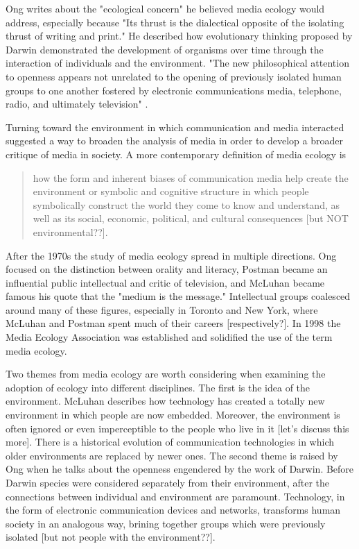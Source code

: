 Ong writes about the "ecological concern" he believed media ecology would address, especially because "Its thrust is the dialectical opposite of the isolating thrust of writing and print." He described how evolutionary thinking proposed by Darwin demonstrated the development of organisms over time through the interaction of individuals and the environment. "The new philosophical attention to openness appears not unrelated to the opening of previously isolated human groups to one another fostered by electronic communications media, telephone, radio,
and ultimately television" \citep[][p. 324]{ong_interfaces_1977}.

Turning toward the environment in which communication and media interacted suggested a way to broaden the analysis of media in order to develop a broader critique of media in society. A more contemporary definition of media ecology is

\begin{quote}
how the form and inherent biases of communication media help create the environment or symbolic and cognitive structure in which people symbolically construct the world they come to know and understand, as well as its social, economic, political, and cultural consequences [but NOT environmental??]. \citep{lum_introduction:_2000}
\end{quote}

After the 1970s the study of media ecology spread in multiple directions. Ong focused on the distinction between orality and literacy, Postman became an influential public intellectual and critic of television, and McLuhan became famous his quote that the "medium is the message." Intellectual groups coalesced around many of these figures, especially in Toronto and New York, where McLuhan and Postman spent much of their careers [respectively?]. In 1998 the Media Ecology Association was established and solidified the use of the term media ecology. 

Two themes from media ecology are worth considering when examining the adoption of ecology into different disciplines. The first is the idea of the environment. McLuhan describes how technology has created a totally new environment in which people are now embedded. Moreover, the environment is often ignored or even imperceptible to the people who live in it [let's discuss this more]. There is a historical evolution of communication technologies in which older environments are replaced by newer ones. The second theme is raised by Ong when he talks about the openness engendered by the work of Darwin. Before Darwin species were considered separately from their environment, after the connections between individual and environment are paramount. Technology, in the form of electronic communication devices and networks, transforms human society in an analogous way, brining together groups which were previously isolated [but not people with the environment??].

